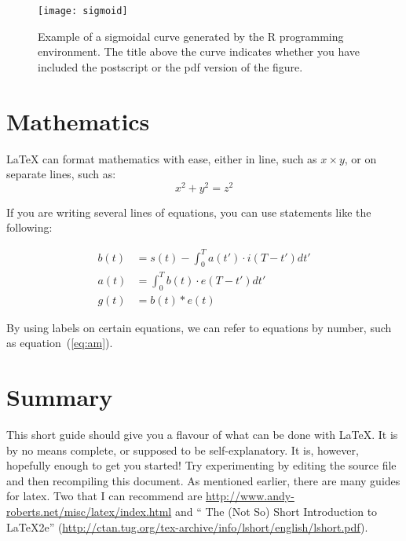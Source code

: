 \documentclass{article}
\providecommand*{\latex}{\LaTeX\xspace}
\begin{document}
\begin{figure}
  \centering
  \texttt{[image: sigmoid]}
  \caption{Example of a sigmoidal curve generated by the R programming
    environment.  The title above the curve indicates whether you have
  included the postscript or the pdf version of the figure.}
  \label{fig:example}
\end{figure}

\section{Mathematics}

\latex can format mathematics with ease, either in line, such as 
$x \times y$, or on separate lines, such as:
\[ x^2 +y^2 = z^2 \]

If you are writing several lines of equations, you can use statements
like the following:

\begin{align}
  b(t) & = s(t) - \int_{0}^{T} a(t') \cdot i(T-t') dt'
  \\
  a(t) & = \int_{0}^{T} b(t) \cdot e(T-t') dt' \label{eq:am}
  \\
  g(t) & = b(t) \ast e(t) \nonumber
\end{align}

By using labels on certain equations, we can refer to equations by
number, such as equation~(\ref{eq:am}).

\section{Summary}
\label{sec:summary}
This short guide should give you a flavour of what can be done with
\latex.  It is by no means complete, or supposed to be
self-explanatory.  It is, however, hopefully enough to get you
started!  Try experimenting by editing the source file and then
recompiling this document.  As mentioned earlier, there are many
guides for latex.  Two that I can recommend are
\url{http://www.andy-roberts.net/misc/latex/index.html} and 
`` The (Not So) Short Introduction to LaTeX2e''
(\url{http://ctan.tug.org/tex-archive/info/lshort/english/lshort.pdf}).





\end{document}
